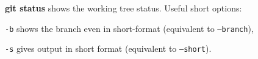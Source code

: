 %

\textbf{git status} shows the working tree status.
Useful short options:
\begin{compactenum}
\item [\texttt{-b}] shows the branch even in short-format (equivalent to \texttt{--branch}),
\item [\texttt{-s}] gives output in short format (equivalent to \texttt{--short}).
\end{compactenum}

%